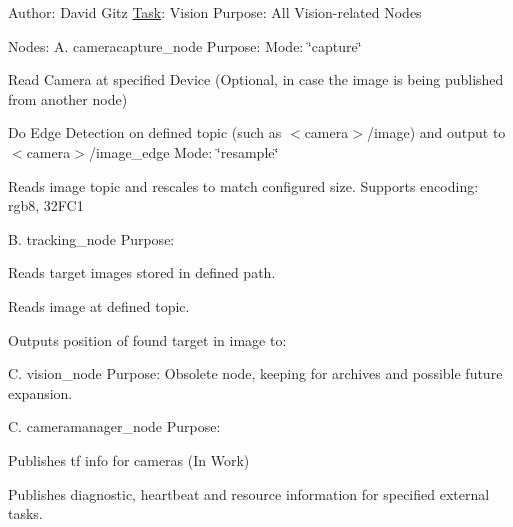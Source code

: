 Author\+: David Gitz \hyperlink{structTask}{Task}\+: Vision Purpose\+: All Vision-\/related Nodes

Nodes\+: A. cameracapture\+\_\+node Purpose\+: Mode\+: \char`\"{}capture\char`\"{}
\begin{DoxyEnumerate}
\item Read Camera at specified Device (Optional, in case the image is being published from another node)
\item Do Edge Detection on defined topic (such as $<$camera$>$/image) and output to $<$camera$>$/image\+\_\+edge Mode\+: \char`\"{}resample\char`\"{}
\end{DoxyEnumerate}
\begin{DoxyEnumerate}
\item Reads image topic and rescales to match configured size. Supports encoding\+: rgb8, 32\+F\+C1
\end{DoxyEnumerate}

B. tracking\+\_\+node Purpose\+:
\begin{DoxyEnumerate}
\item Reads target images stored in defined path.
\item Reads image at defined topic.
\item Outputs position of found target in image to\+:
\end{DoxyEnumerate}

C. vision\+\_\+node Purpose\+: Obsolete node, keeping for archives and possible future expansion.

C. cameramanager\+\_\+node Purpose\+:
\begin{DoxyEnumerate}
\item Publishes tf info for cameras (In Work)
\item Publishes diagnostic, heartbeat and resource information for specified external tasks. 
\end{DoxyEnumerate}